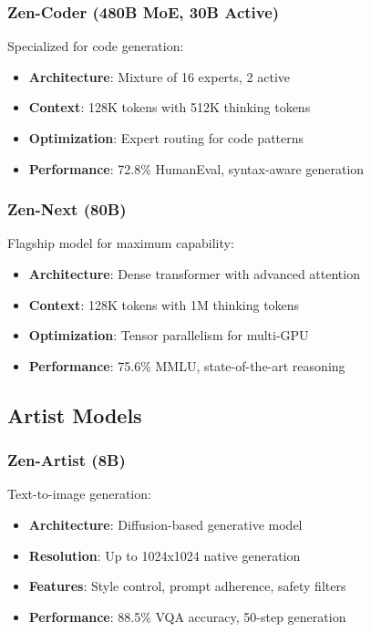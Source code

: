 \documentclass[11pt,a4paper]{article}
\begin{document}
\subsubsection{Zen-Coder (480B MoE, 30B Active)}
Specialized for code generation:
\begin{itemize}
    \item \textbf{Architecture}: Mixture of 16 experts, 2 active
    \item \textbf{Context}: 128K tokens with 512K thinking tokens
    \item \textbf{Optimization}: Expert routing for code patterns
    \item \textbf{Performance}: 72.8\% HumanEval, syntax-aware generation
\end{itemize}

\subsubsection{Zen-Next (80B)}
Flagship model for maximum capability:
\begin{itemize}
    \item \textbf{Architecture}: Dense transformer with advanced attention
    \item \textbf{Context}: 128K tokens with 1M thinking tokens
    \item \textbf{Optimization}: Tensor parallelism for multi-GPU
    \item \textbf{Performance}: 75.6\% MMLU, state-of-the-art reasoning
\end{itemize}

\subsection{Artist Models}

\subsubsection{Zen-Artist (8B)}
Text-to-image generation:
\begin{itemize}
    \item \textbf{Architecture}: Diffusion-based generative model
    \item \textbf{Resolution}: Up to 1024x1024 native generation
    \item \textbf{Features}: Style control, prompt adherence, safety filters
    \item \textbf{Performance}: 88.5\% VQA accuracy, 50-step generation
\end{itemize}
\end{document}
